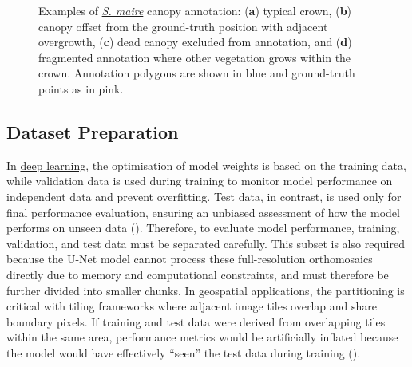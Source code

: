 \documentclass[
]{scrreprt}
\begin{document}
\begin{figure}[H]
{\begin{figure}[H]
\begin{minipage}{0.49\linewidth}
\end{minipage}%

\end{figure}%

}

\caption[Annotation examples.]{\label{fig-digitisation_examples}Examples
of \hyperref[acronyms_SM]{\emph{S. maire}} canopy annotation:
(\textbf{a}) typical crown, (\textbf{b}) canopy offset from the
ground-truth position with adjacent overgrowth, (\textbf{c}) dead canopy
excluded from annotation, and (\textbf{d}) fragmented annotation where
other vegetation grows within the crown. Annotation polygons are shown
in blue and ground-truth points as in pink.}

\end{figure}%

\subsection{Dataset Preparation}\label{dataset-preparation}

In \hyperref[acronyms_DL]{deep learning}, the optimisation of model
weights is based on the training data, while validation data is used
during training to monitor model performance on independent data and
prevent overfitting. Test data, in contrast, is used only for final
performance evaluation, ensuring an unbiased assessment of how the model
performs on unseen data (). Therefore, to evaluate model performance, training,
validation, and test data must be separated carefully. This subset is
also required because the U-Net model cannot process these
full-resolution orthomosaics directly due to memory and computational
constraints, and must therefore be further divided into smaller chunks.
In geospatial applications, the partitioning is critical with tiling
frameworks where adjacent image tiles overlap and share boundary pixels.
If training and test data were derived from overlapping tiles within the
same area, performance metrics would be artificially inflated because
the model would have effectively ``seen'' the test data during training
().
\end{document}
